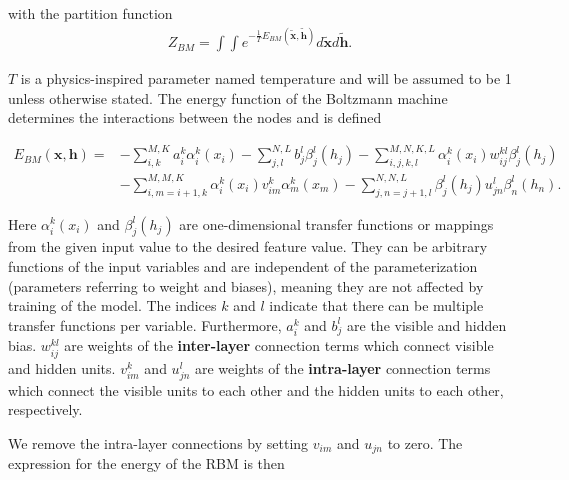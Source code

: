 \documentclass[%
oneside,                 %
final,                   %
10pt]{article}
\begin{document}
with the partition function 
\begin{align}
	Z_{BM} = \int \int e^{-\frac{1}{T} E_{BM}(\tilde{\bm{x}}, \tilde{\bm{h}})} d\tilde{\bm{x}} d\tilde{\bm{h}} .
\end{align}

$T$ is a physics-inspired parameter named temperature and will be assumed to be 1 unless otherwise stated. The energy function of the Boltzmann machine determines the interactions between the nodes and is defined  

\begin{align}
	E_{BM}(\bm{x}, \bm{h}) =& - \sum_{i, k}^{M, K} a_i^k \alpha_i^k (x_i)
	- \sum_{j, l}^{N, L} b_j^l \beta_j^l (h_j) 
	- \sum_{i,j,k,l}^{M,N,K,L} \alpha_i^k (x_i) w_{ij}^{kl} \beta_j^l (h_j) \nonumber \\
	&- \sum_{i, m=i+1, k}^{M, M, K} \alpha_i^k (x_i) v_{im}^k \alpha_m^k (x_m)
	- \sum_{j,n=j+1,l}^{N,N,L} \beta_j^l (h_j) u_{jn}^l \beta_n^l (h_n).
\end{align}

Here $\alpha_i^k (x_i)$ and $\beta_j^l (h_j)$ are one-dimensional
transfer functions or mappings from the given input value to the
desired feature value. They can be arbitrary functions of the input
variables and are independent of the parameterization (parameters
referring to weight and biases), meaning they are not affected by
training of the model. The indices $k$ and $l$ indicate that there can
be multiple transfer functions per variable.  Furthermore, $a_i^k$ and
$b_j^l$ are the visible and hidden bias. $w_{ij}^{kl}$ are weights of
the \textbf{inter-layer} connection terms which connect visible and
hidden units. $ v_{im}^k$ and $u_{jn}^l$ are weights of the
\textbf{intra-layer} connection terms which connect the visible units
to each other and the hidden units to each other, respectively.



We remove the intra-layer connections by setting $v_{im}$ and $u_{jn}$
to zero. The expression for the energy of the RBM is then
\end{document}
